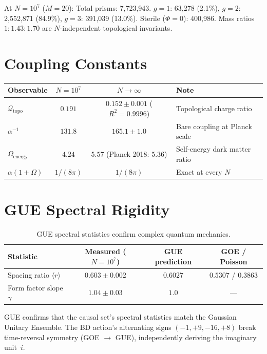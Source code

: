 \documentclass[11pt, a4paper, openany]{book}
\begin{document}
At $N = 10^7$ ($M{=}20$): Total prisms: 7{,}723{,}943.
$g{=}1$: 63{,}278 (2.1\%), $g{=}2$: 2{,}552{,}871 (84.9\%),
$g{=}3$: 391{,}039 (13.0\%).  Sterile ($\Phi{=}0$): 400{,}986.
Mass ratios $1 : 1.43 : 1.70$ are $N$-independent topological invariants.

\section{Coupling Constants}

\begin{table}[H]
\centering
\begin{tabular}{@{} l c c l @{}}
\toprule
\textbf{Observable} & $N{=}10^7$ & $N{\to}\infty$ & \textbf{Note} \\
\midrule
$\mathcal{Q}_{\mathrm{topo}}$ & $0.191$ & $0.152 \pm 0.001$ ($R^2{=}0.9996$) & Topological charge ratio \\
$\alpha^{-1}$                 & $131.8$ & $165.1 \pm 1.0$                     & Bare coupling at Planck scale \\
$\Omega_{\mathrm{energy}}$    & $4.24$  & $5.57$ (Planck 2018: $5.36$)        & Self-energy dark matter ratio \\
$\alpha(1+\Omega)$            & $1/(8\pi)$ & $1/(8\pi)$                       & Exact at every $N$ \\
\bottomrule
\end{tabular}
\end{table}

\section{GUE Spectral Rigidity}

\begin{table}[H]
\centering
\begin{tabular}{@{} l c c c @{}}
\toprule
\textbf{Statistic} & \textbf{Measured ($N{=}10^7$)} & \textbf{GUE prediction} & \textbf{GOE / Poisson} \\
\midrule
Spacing ratio $\langle r \rangle$ & $0.603 \pm 0.002$ & $0.6027$ & $0.5307$ / $0.3863$ \\
Form factor slope $\gamma$        & $1.04 \pm 0.03$   & $1.0$    & --- \\
\bottomrule
\end{tabular}
\caption{GUE spectral statistics confirm complex quantum mechanics.}
\end{table}

GUE confirms that the causal set's spectral statistics match the Gaussian Unitary
Ensemble.  The BD action's alternating signs $(-1, +9, -16, +8)$ break time-reversal
symmetry (GOE $\to$ GUE), independently deriving the imaginary unit~$i$.
\end{document}
